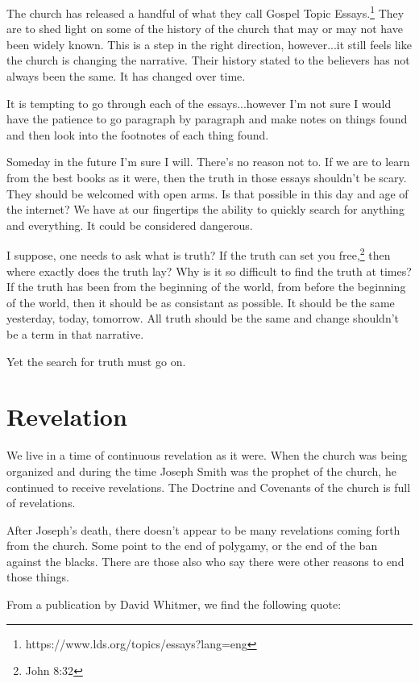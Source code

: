 \documentclass{article}
\begin{document}
The church has released a handful of what they call Gospel Topic 
Essays.\footnote{https://www.lds.org/topics/essays?lang=eng} They are to shed
light on some of the history of the church that may or may not have been
widely known. This is a step in the right direction, however...it still feels
like the church is changing the narrative. Their history stated to the believers
has not always been the same. It has changed over time.

It is tempting to go through each of the essays...however I'm not sure I would
have the patience to go paragraph by paragraph and make notes on things found
and then look into the footnotes of each thing found.

Someday in the future I'm sure I will. There's no reason not to. If we are to
learn from the best books as it were, then the truth in those essays shouldn't
be scary. They should be welcomed with open arms. Is that possible in this day
and age of the internet? We have at our fingertips the ability to quickly search
for anything and everything. It could be considered dangerous.

I suppose, one needs to ask what is truth? If the truth can set you 
free,\footnote{John 8:32} then where exactly does the truth lay? Why is it so
difficult to find the truth at times? If the truth has been from the beginning
of the world, from before the beginning of the world, then it should be as
consistant as possible. It should be the same yesterday, today, tomorrow. All
truth should be the same and change shouldn't be a term in that narrative.

Yet the search for truth must go on.

\newpage

\section{Revelation}

We live in a time of continuous revelation as it were. When the church was
being organized and during the time Joseph Smith was the prophet of the church,
he continued to receive revelations. The Doctrine and Covenants of the church
is full of revelations.

After Joseph's death, there doesn't appear to be many revelations coming forth
from the church. Some point to the end of polygamy, or the end of the ban 
against the blacks. There are those also who say there were other reasons
to end those things.

From a publication by David Whitmer, we find the following quote:
\end{document}

